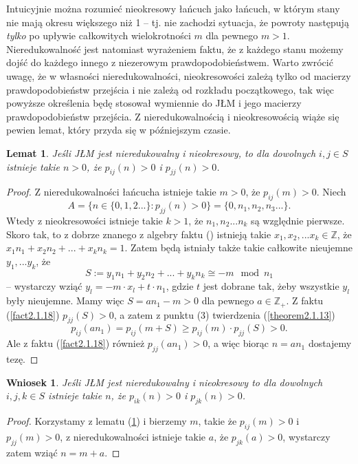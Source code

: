 \documentclass[a4paper]{article}
\theoremstyle{defn}
\theoremstyle{theorem}
\theoremstyle{lemma}
\newtheorem{lemma}[defn]{Lemat}
\theoremstyle{cor}
\newtheorem{cor}[defn]{Wniosek}
\theoremstyle{fact}
\begin{document}
Intuicyjnie można rozumieć nieokresowy łańcuch jako łańcuch, w którym stany nie mają okresu większego niż 1 – tj. nie zachodzi sytuacja, że powroty następują \textit{tylko} po upływie całkowitych wielokrotności $m$ dla pewnego $m>1$. Nieredukowalność jest natomiast wyrażeniem faktu, że z każdego stanu możemy dojść do każdego innego z niezerowym prawdopodobieństwem. Warto zwrócić uwagę, że w własności nieredukowalności, nieokresowości zależą tylko od macierzy prawdopodobieństw przejścia i nie zależą od rozkładu początkowego, tak więc powyższe określenia będę stosował wymiennie do JŁM i jego macierzy prawdopodobieństw przejścia. Z nieredukowalnością i nieokresowością wiąże się pewien lemat, który przyda się w późniejszym czasie.
\begin{lemma}\label{lemma2.1.19}
Jeśli JŁM jest nieredukowalny i nieokresowy, to dla dowolnych $i,j \in S$ istnieje takie $n > 0$, że $p_{ij}(n) > 0$ i $p_{jj}(n) > 0$.
\end{lemma}
\begin{proof}
Z nieredukowalności łańcucha istnieje takie $m > 0$, że $p_{ij}(m) > 0$.  Niech
$$A = \{n \in \{0, 1, 2...\}:  p_{jj}(n) > 0\} = \{0, n_1, n_2, n_3 ... \}.$$
Wtedy z nieokresowości istnieje takie $k > 1$, że $n_1, n_2... n_k$ są względnie pierwsze. Skoro tak, to z dobrze znanego z algebry faktu (\cite{bezout}) istnieją takie $x_1, x_2, ... x_k \in \mathbb{Z}$, że $x_1n_1 + x_2n_2 + ... + x_k n_k = 1$.  Zatem będą istniały także takie całkowite nieujemne $ y_1, ... y_k$, że
$$S := y_1n_1 + y_2n_2 + ... + y_k n_k \cong -m \mod n_1$$
– wystarczy wziąć $y_l = -m \cdot x_l + t \cdot n_1$, gdzie $t$ jest dobrane tak, żeby wszystkie $y_l$ były nieujemne. Mamy więc $S = an_1 - m > 0$ dla pewnego $a \in \mathbb{Z}_+$. Z faktu (\ref{fact2.1.18}) $p_{jj}(S) > 0$, a zatem z punktu (3) twierdzenia (\ref{theorem2.1.13})  $$p_{ij}(an_1) = p_{ij}(m + S) \geq p_{ij}(m)\cdot p_{jj}(S) > 0.$$
Ale z faktu (\ref{fact2.1.18}) również $p_{jj}(an_1) > 0$, a więc biorąc $n = an_1$ dostajemy tezę.
\end{proof}

\begin{cor}\label{cor2.1.20}
Jeśli JŁM jest nieredukowalny i nieokresowy to dla dowolnych $i,j,k \in S$ istnieje takie $n$, że $p_{ik}(n) > 0$ i $p_{jk}(n) > 0$.
\end{cor}
\begin{proof}
Korzystamy z lematu (\ref{lemma2.1.19}) i bierzemy $m$, takie że $p_{ij}(m) > 0$ i $p_{jj}(m) > 0$, z nieredukowalności istnieje takie $a$, że $p_{jk}(a) > 0$, wystarczy zatem wziąć $n = m + a$.
\end{proof}
\end{document}
